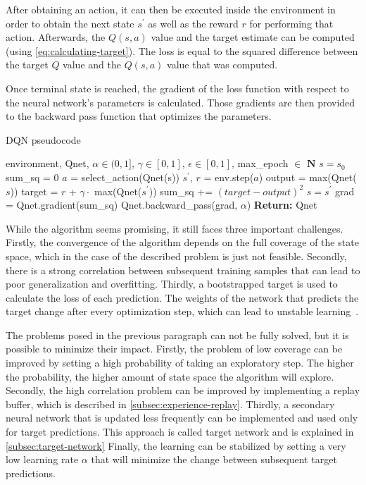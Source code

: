 \documentclass{article}
\begin{document}
After obtaining an action, it can then be executed inside the environment in order to obtain the next state $s^\prime$
as well as the reward $r$ for performing that action.
Afterwards, the $Q(s,a)$ value and the target estimate can be computed (using \autoref{eq:calculating-target}).
The loss is equal to the squared difference between the target $Q$ value and the $Q(s,a)$ value that was computed.

Once terminal state is reached, the gradient of the loss function with respect to the neural network's parameters is calculated.
Those gradients are then provided to the backward pass function that optimizes the parameters.


\begin{algorithm}
   \caption{DQN pseudocode}
   \begin{algorithmic}
      \REQUIRE environment, Qnet, $\alpha \in (0,1]$, $\gamma \in [0,1]$, $\epsilon \in [0,1]$, max\_epoch $\in$ $\mathbf{N}$
      \STATE $s = s_0$ 
         \STATE sum\_sq = 0
            \STATE $a$ = select\_action(Qnet(s))
            \STATE $s^\prime$, $r$ = env.step($a$)
            \STATE output = max(Qnet($s$))
            \STATE target = $r$ + $\gamma \cdot$ max(Qnet($s^\prime$))
            \STATE sum\_sq += $(target - output)^2$
            \STATE $s = s^\prime$
         \ENDWHILE
         \STATE grad = Qnet.gradient(sum\_sq)
         \STATE Qnet.backward\_pass(grad, $\alpha$)
      \ENDFOR
      \STATE \textbf{Return:} Qnet
   \end{algorithmic}
   \label{alg:dqn}
\end{algorithm}

While the algorithm seems promising, it still faces three important challenges.
Firstly, the convergence of the algorithm depends on the full coverage of the state space, which in the case of the described
problem is just not feasible.
Secondly, there is a strong correlation between subsequent training samples that can lead to poor generalization and overfitting.
Thirdly, a bootstrapped target is used to calculate the loss of each prediction.
The weights of the network that predicts the target change after every optimization step, which can lead to unstable learning~\cite{DBLP:books/sp/Plaat22}.

The problems posed in the previous paragraph can not be fully solved, but it is possible to minimize their impact.
Firstly, the problem of low coverage can be improved by setting a high probability of taking an exploratory step.
The higher the probability, the higher amount of state space the algorithm will explore.
Secondly, the high correlation problem can be improved by implementing a replay buffer, which is described in \autoref{subsec:experience-replay}.
Thirdly, a secondary neural network that is updated less frequently can be implemented and used only for target predictions.
This approach is called target network and is explained in \autoref{subsec:target-network}
Finally, the learning can be stabilized by setting a very low learning rate $\alpha$ that will minimize the change between
subsequent target predictions.
\end{document}
